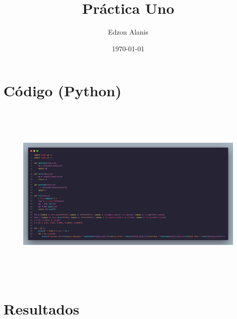 \documentclass[12pt]{article}
\title{Práctica Uno}
\author{Edzon Alanis}
\date{\today}
\begin{document}
\maketitle
\section{Código (Python)}
\begin{figure}[H]
    \centering
    \includegraphics[width = \textwidth, height = 9cm, keepaspectratio]{code.png}
\end{figure}

\section{Resultados}
\end{document}
